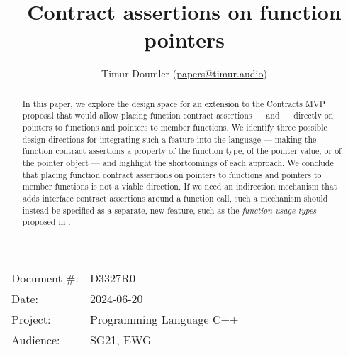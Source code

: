 

 \usepackage[bottom]{footmisc} 

 \usepackage{longtable}


\usepackage{tikz,lipsum,lmodern}
\usepackage[most]{tcolorbox}



\usepackage{titlesec}
\usepackage{tocloft}


\newcommand{\changelocaltocdepth}[1]{%
  \addtocontents{toc}{\protect\setcounter{tocdepth}{#1}}%
  \setcounter{tocdepth}{#1}%
}

\setcounter{tocdepth}{3}



\title{Contract assertions on function pointers}
\author{ Timur Doumler \small(\href{mailto:papers@timur.audio}{papers@timur.audio}) 
}
\date{}
\maketitle

\begin{tabular}{ll}
Document \#: & D3327R0 \\
Date: &2024-06-20 \\
Project: & Programming Language C++ \\
Audience: & SG21, EWG
\end{tabular}

\begin{abstract}
In this paper, we explore the design space for an extension to the Contracts MVP proposal \cite{P2900R7} that would allow placing function contract assertions ---  and  --- directly on pointers to functions and pointers to member functions. We identify three possible design directions for integrating such a feature into the language --- making the function contract assertions a property of the function type, of the pointer value, or of the pointer object --- and highlight the shortcomings of each approach. We conclude that placing function contract assertions on pointers to functions and pointers to member functions is not a viable direction. If we need an indirection mechanism that adds interface contract assertions around a function call, such a mechanism should instead be specified as a separate, new feature, such as the \emph{function usage types} proposed in \cite{P3271R0}.
\end{abstract}

